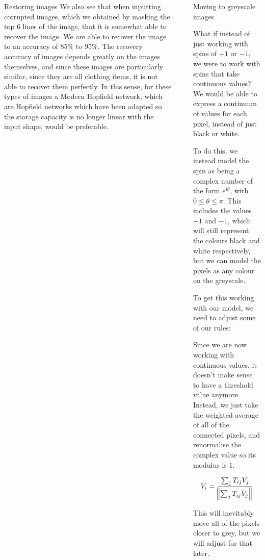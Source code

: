 \documentclass[25pt, a0paper, portrait]{beamer}
\newlength{\sepwidth}
\newlength{\colwidth}
\newcommand{\separatorcolumn}{\begin{column}{\sepwidth}\end{column}}
\begin{document}
\begin{frame}[t]
\begin{columns}[t]
\begin{column}{\colwidth}
\begin{block}{Restoring images}
    We also see that when inputting corrupted images, which we obtained by masking the
    top $6$ lines of the image, that it is somewhat able to recover the image.
    We are able to recover the image to an accuracy of $85\%$ to $95\%$. The recovery
    accuracy of images depends greatly on the images themselves, and since these images
    are particularly similar, since they are all clothing items, it is not able to recover
    them perfectly. In this sense, for these types of images a Modern Hopfield network,
    which are Hopfield networks which have been adapted so the storage capacity is no longer
    linear with the input shape, would be preferable. \cite{ramsauer:2021}

  \end{block}

\end{column}

\separatorcolumn

\begin{column}{\colwidth}

  \begin{block}{Moving to greyscale images} \small

    What if instead of just working with spins of $+1$ or $-1$, we were to work
    with spins that take continuous values? We would be able to express a continuum
    of values for each pixel, instead of just black or white.

    To do this, we instead model the spin as being a complex number of the form $e^{i\theta}$,
    with $0 \le \theta \le \pi$. This includes the values $+1$ and $-1$, which will still
    represent the colours black and white respectively, but we can model the pixels
    as any colour on the greyscale.

    To get this working with our model, we need to adjust some of our rules:


    Since we are now working with continuous values, it doesn't make sense to have a threshold
    value anymore. Instead, we just take the weighted average of all of the connected pixels,
    and renormalise the complex value so its modulus is $1$.

    \begin{equation} \label{complex_update_rule}
      V_i = \frac{\sum_{j}T_{ij}V_j}{\norm{\sum_{j}T_{ij}V_j}}
    \end{equation}

    This will inevitably move all of the pixels closer to grey, but we will adjust for that later.


\end{block}
\end{column}
\end{columns}
\end{frame}
\end{document}
